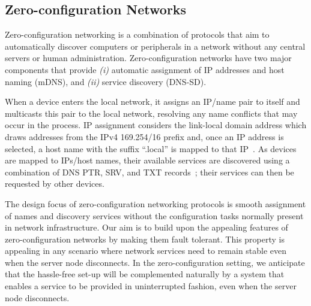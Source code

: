 \subsection{Zero-configuration Networks}
\label{sec:zeroconf}

Zero-configuration networking is a combination of protocols that aim to automatically discover computers or peripherals in a network without any central servers or human administration. Zero-configuration networks have two major components that provide {\it (i)} automatic assignment of IP addresses and host naming (mDNS), and {\it (ii)} service discovery (DNS-SD).

When a device enters the local network, it assigns an IP/name pair to itself and  multicasts this pair to the local network, resolving any name conflicts that may occur in the process. IP assignment considers the link-local domain address which draws addresses from the IPv4 169.254/16 prefix and, once an IP address is selected, a host name with the suffix ``.local'' is mapped to that IP~\cite{rfc6762}. As devices are mapped to IPs/host names, their available services are discovered using a combination of DNS PTR, SRV, and TXT records~\cite{rfc6763}; their services can then be requested by other devices.

The design focus of zero-configuration networking protocols is smooth assignment of names and discovery services without the configuration tasks normally present in network infrastructure. 
Our aim is to build upon the appealing features of zero-configuration networks by making them fault tolerant.
This property is appealing in any scenario where network services need to remain stable even when the server node disconnects.
In the zero-configuration setting, we anticipate that the hassle-free set-up will be complemented naturally by a system that enables a service to be provided in uninterrupted fashion, even when the server node disconnects.
